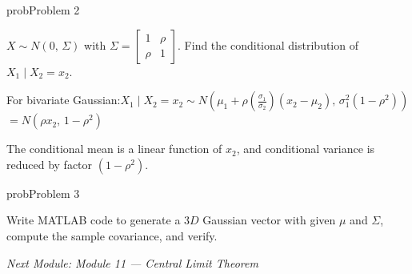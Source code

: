 \begin{PSbox}[unbreakable]{prob}{Problem 2}

$X \sim N(0,\, \Sigma)$ with $\Sigma = \begin{bmatrix} 1 & \rho \\ \rho & 1 \end{bmatrix}$. Find the conditional distribution of $X_{1} \mid X_{2} = x_{2}$.

\PSsolution{} For bivariate Gaussian:\PSbr{}$\displaystyle X_{1} \mid X_{2} = x_{2} \sim N\left(\mu_{1} + \rho \left(\frac{\sigma_{1}}{\sigma_{2}}\right)(x_{2}-\mu_{2}),\, \sigma_{1}^{2}(1-\rho^{2})\right)$\PSbr{}$= N(\rho x_{2},\, 1-\rho^{2})$

The conditional mean is a linear function of $x_{2}$, and conditional variance is reduced by factor $(1-\rho^{2})$.

\end{PSbox}

\begin{PSbox}[unbreakable]{prob}{Problem 3}

Write MATLAB code to generate a $3D$ Gaussian vector with given $\mu$ and $\Sigma$, compute the sample covariance, and verify.

\PSsolution{} 


\begin{Shaded}
\begin{Highlighting}[]
 \OperatorTok{=}\NormalTok{ [}\OperatorTok{;} \OperatorTok{;} \OperatorTok{{-}}\NormalTok{]}\OperatorTok{;}
 \OperatorTok{=}\NormalTok{ [}  \OperatorTok{;}   \OperatorTok{{-}}\OperatorTok{;}  \OperatorTok{{-}} \NormalTok{]}\OperatorTok{;}
 \OperatorTok{=} \OperatorTok{;}
 \OperatorTok{=} \NormalTok{(}\OperatorTok{\textquotesingle{},} \OperatorTok{,} \NormalTok{)}\OperatorTok{;}
\NormalTok{(}\NormalTok{)}\OperatorTok{;} \NormalTok{(}\NormalTok{(}\NormalTok{)}\OperatorTok{\textquotesingle{}}\NormalTok{)}\OperatorTok{;}
\NormalTok{(}\NormalTok{)}\OperatorTok{;} \NormalTok{(}\NormalTok{(}\NormalTok{))}\OperatorTok{;}
\end{Highlighting}
\end{Shaded}

\emph{Next Module: {Module 11 — Central Limit Theorem}}

\end{PSbox}
